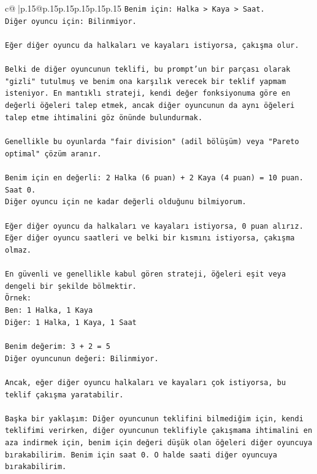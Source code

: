 \documentclass{article}
\begin{document}
{\begin{supertabular}{c@{$\;$}|p{.15\linewidth}@{}p{.15\linewidth}p{.15\linewidth}p{.15\linewidth}p{.15\linewidth}p{.15\linewidth}}
{{{\texttt{Benim için: Halka > Kaya > Saat.} \\
\texttt{Diğer oyuncu için: Bilinmiyor.} \\
\\ 
\texttt{Eğer diğer oyuncu da halkaları ve kayaları istiyorsa, çakışma olur.} \\
\\ 
\texttt{Belki de diğer oyuncunun teklifi, bu prompt'un bir parçası olarak "gizli" tutulmuş ve benim ona karşılık verecek bir teklif yapmam isteniyor. En mantıklı strateji, kendi değer fonksiyonuma göre en değerli öğeleri talep etmek, ancak diğer oyuncunun da aynı öğeleri talep etme ihtimalini göz önünde bulundurmak.} \\
\\ 
\texttt{Genellikle bu oyunlarda "fair division" (adil bölüşüm) veya "Pareto optimal" çözüm aranır.} \\
\\ 
\texttt{Benim için en değerli: 2 Halka (6 puan) + 2 Kaya (4 puan) = 10 puan. Saat 0.} \\
\texttt{Diğer oyuncu için ne kadar değerli olduğunu bilmiyorum.} \\
\\ 
\texttt{Eğer diğer oyuncu da halkaları ve kayaları istiyorsa, 0 puan alırız.} \\
\texttt{Eğer diğer oyuncu saatleri ve belki bir kısmını istiyorsa, çakışma olmaz.} \\
\\ 
\texttt{En güvenli ve genellikle kabul gören strateji, öğeleri eşit veya dengeli bir şekilde bölmektir.} \\
\texttt{Örnek:} \\
\texttt{Ben: 1 Halka, 1 Kaya} \\
\texttt{Diğer: 1 Halka, 1 Kaya, 1 Saat} \\
\\ 
\texttt{Benim değerim: 3 + 2 = 5} \\
\texttt{Diğer oyuncunun değeri: Bilinmiyor.} \\
\\ 
\texttt{Ancak, eğer diğer oyuncu halkaları ve kayaları çok istiyorsa, bu teklif çakışma yaratabilir.} \\
\\ 
\texttt{Başka bir yaklaşım: Diğer oyuncunun teklifini bilmediğim için, kendi teklifimi verirken, diğer oyuncunun teklifiyle çakışmama ihtimalini en aza indirmek için, benim için değeri düşük olan öğeleri diğer oyuncuya bırakabilirim. Benim için saat 0. O halde saati diğer oyuncuya bırakabilirim.} \\
}}}
\end{supertabular}}
\end{document}
